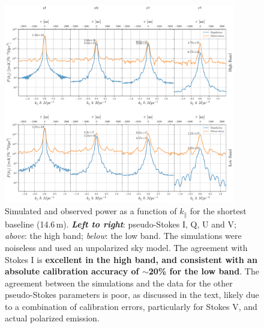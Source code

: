 \documentclass[twocolumn, trackchanges]{aastex61}
\newcommand{\edited}[1]{{\bf \color{blue} #1}}
\begin{document}
\begin{figure}[h]
\centering
\includegraphics[width=0.9\textwidth]{real_sim_compare_noinset.pdf}
\caption{Simulated and observed power as a function of $k_{\parallel}$ for the
  shortest baseline (14.6\,m). \edited{\textit{Left to right}}: pseudo-Stokes I,
  Q, U and V; \textit{above}: the high band; \textit{below}: the low band. The
  simulations were noiseless and used an unpolarized sky model. The agreement
  with Stokes I is \edited{excellent in the high band, and consistent with an
    absolute calibration accuracy of $\sim$20\% for the low band}.  The
  agreement between the simulations and the data for the other pseudo-Stokes
  parameters is poor, as discussed in the text, likely due to a combination of
  calibration errors, particularly for Stokes V, and actual polarized emission.}
\label{fig:bl0_cuts_vs_sim}
\end{figure}
\end{document}
